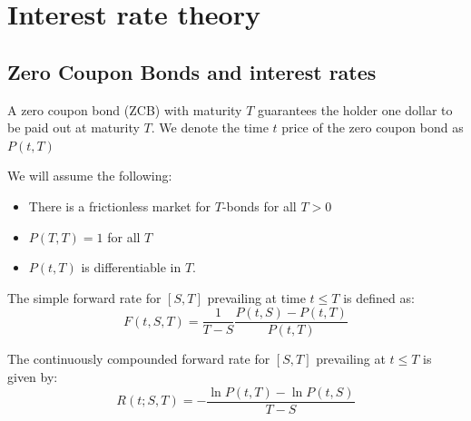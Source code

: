 \chapter{Interest rate theory}
\label{chp_interest_rate_theory}

\section{Zero Coupon Bonds and interest rates}

\begin{definition}
A zero coupon bond (ZCB)  with maturity $T$ guarantees the holder one dollar to be paid out at maturity $T$. We denote the time $t$ price of the zero coupon bond as $P(t,T)$
\end{definition}

We will assume the following: 
\begin{itemize}
    \item There is a frictionless market for $T$-bonds for all $T>0$
    \item $P(T,T) = 1$ for all $T$
    \item $P(t,T)$ is differentiable in $T$.
\end{itemize} 


\begin{definition}
The simple forward rate for $[S,T]$ prevailing at time $t\leq T$
is defined as: 
\begin{equation*}
F(t,S,T) = \frac{1}{T-S}\frac{P(t,S)-P(t,T)}{P(t,T)}    
\end{equation*}
\end{definition}

\begin{definition}
The continuously compounded forward rate for $[S,T]$ prevailing at $t\leq T$ is given by:
\begin{equation*}
    R(t;S,T) = -\frac{\ln{P(t,T)}-\ln{P(t,S)}}{T-S}
\end{equation*}    
\end{definition}


